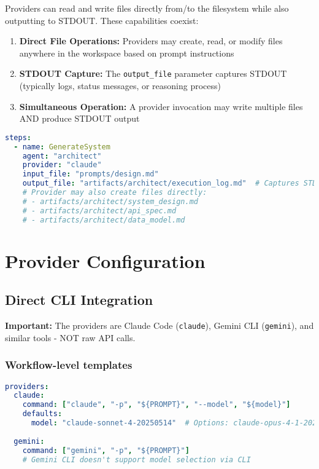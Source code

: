 \documentclass[11pt,a4paper]{article}
\begin{document}
Providers can read and write files directly from/to the filesystem while also outputting to STDOUT. These capabilities coexist:

\begin{enumerate}
    \item \textbf{Direct File Operations:} Providers may create, read, or modify files anywhere in the workspace based on prompt instructions
    \item \textbf{STDOUT Capture:} The \texttt{output\_file} parameter captures STDOUT (typically logs, status messages, or reasoning process)
    \item \textbf{Simultaneous Operation:} A provider invocation may write multiple files AND produce STDOUT output
\end{enumerate}

\begin{lstlisting}[language=yaml, caption={Provider File Operations Example}]
steps:
  - name: GenerateSystem
    agent: "architect"
    provider: "claude"
    input_file: "prompts/design.md"
    output_file: "artifacts/architect/execution_log.md"  # Captures STDOUT
    # Provider may also create files directly:
    # - artifacts/architect/system_design.md
    # - artifacts/architect/api_spec.md
    # - artifacts/architect/data_model.md
\end{lstlisting}



\section{Provider Configuration}

\subsection{Direct CLI Integration}

\textbf{Important:} The providers are Claude Code (\texttt{claude}), Gemini CLI (\texttt{gemini}), and similar tools - NOT raw API calls.

\subsubsection{Workflow-level templates}

\begin{lstlisting}[language=yaml, caption={Provider Configuration}]
providers:
  claude:
    command: ["claude", "-p", "${PROMPT}", "--model", "${model}"]
    defaults:
      model: "claude-sonnet-4-20250514"  # Options: claude-opus-4-1-20250805
  
  gemini:
    command: ["gemini", "-p", "${PROMPT}"]
    # Gemini CLI doesn't support model selection via CLI
\end{lstlisting}
\end{document}
